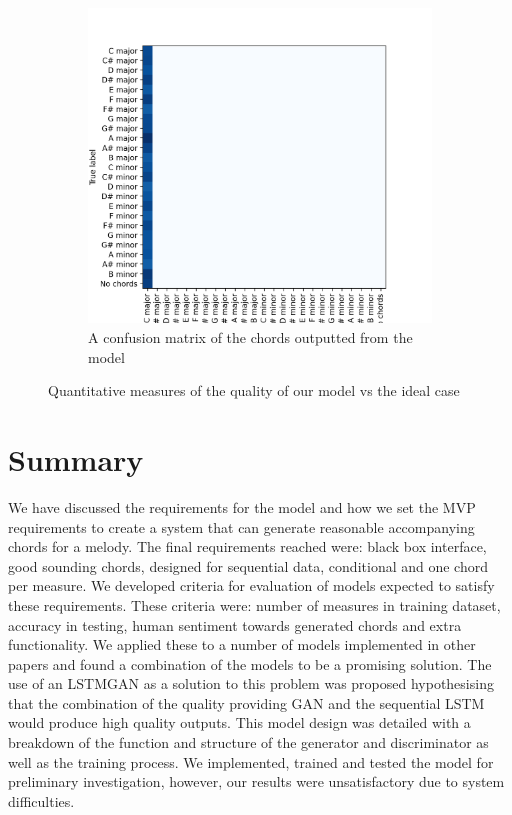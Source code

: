\begin{figure}
    \hfill
    \begin{subfigure}{0.3\columnwidth}
        \centering
        \includegraphics[width=\columnwidth]{Figures/confusion_real}
        \decoRule
        \caption{A confusion matrix of the chords outputted from the model}
        \label{fig:confusion_real}
    \end{subfigure}
    \caption{Quantitative measures of the quality of our model vs the ideal case}
\end{figure}
\section{Summary}

We have discussed the requirements for the model and how we set the MVP requirements to create a system that can generate reasonable accompanying chords for a melody.
The final requirements reached were: black box interface, good sounding chords, designed for sequential data, conditional and one chord per measure.
We developed criteria for evaluation of models expected to satisfy these requirements.
These criteria were: number of measures in training dataset, accuracy in testing, human sentiment towards generated chords and extra functionality.  
We applied these to a number of models implemented in other papers and found a combination of the models to be a promising solution. 
The use of an LSTMGAN as a solution to this problem was proposed hypothesising that the combination of the quality providing GAN and the sequential LSTM would produce high quality outputs.
This model design was detailed with a breakdown of the function and structure of the generator and discriminator as well as the training process.
We implemented, trained and tested the model for preliminary investigation, however, our results were unsatisfactory due to system difficulties.

